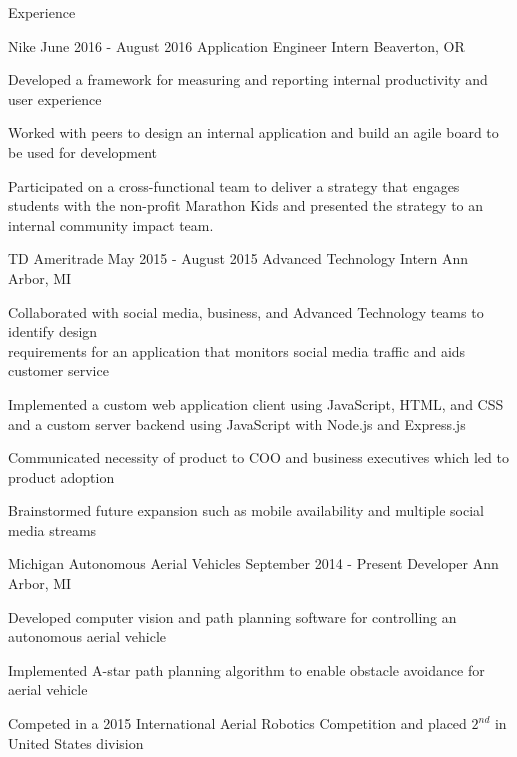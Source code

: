 \documentclass{resume}
\begin{document}
\begin{rSection}{Experience}

\begin{rSubsection}{Nike}
                   {June 2016 - August 2016}
                   {Application Engineer Intern}
                   {Beaverton, OR}
    \item Developed a framework for measuring and
          reporting internal productivity and user experience
    \item Worked with peers to design an internal application and
          build an agile board to be used for development
    \item Participated on a cross-functional team to deliver a strategy that
          engages students with the non-profit Marathon Kids and presented the
          strategy to an internal community impact team.
\end{rSubsection}

\begin{rSubsection}{TD Ameritrade}
                   {May 2015 - August 2015}
                   {Advanced Technology Intern}
                   {Ann Arbor, MI}
    \item Collaborated with social media, business, and Advanced Technology
          teams to identify design \\ requirements for an application that
          monitors social media traffic and aids customer service
    \item Implemented a custom web application client using JavaScript, HTML,
          and CSS and a custom server backend using JavaScript with Node.js and
          Express.js
    \item Communicated necessity of product to COO and business executives which
          led to product adoption 
    \item Brainstormed future expansion such as mobile availability and multiple
          social media streams
\end{rSubsection}


\begin{rSubsection}{Michigan Autonomous Aerial Vehicles}
                   {September 2014 - Present}
                   {Developer}
                   {Ann Arbor, MI}
    \item Developed computer vision and path planning software for controlling
          an autonomous aerial vehicle
    \item Implemented A-star path planning algorithm to enable obstacle
          avoidance for aerial vehicle
    \item Competed in a 2015 International Aerial Robotics Competition and
          placed $2^{nd}$ in United States division
\end{rSubsection}


\end{rSection}
\end{document}
